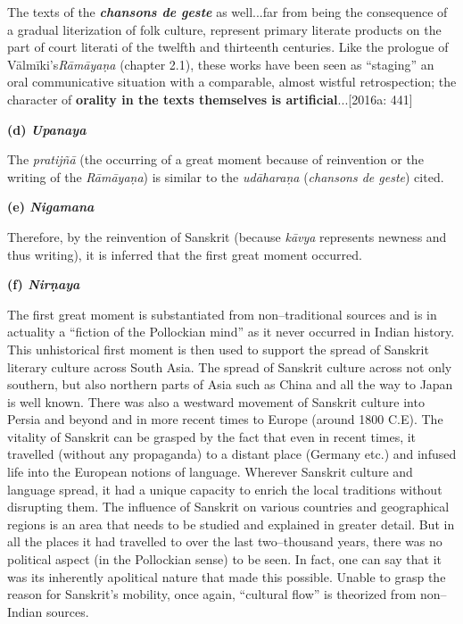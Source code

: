 \begin{myquote}
The texts of the \textit{\textbf{chansons de geste}} as well...far from being the consequence of a gradual literization of folk culture, represent primary literate products on the part of court literati of the twelfth and thirteenth centuries. Like the prologue of Vālmīki’s\textit{Rāmāyaṇa} (chapter 2.1), these works have been seen as “staging” an oral communicative situation with a comparable, almost wistful retrospection; the character of \textbf{orality in the texts themselves is artiﬁcial}...[2016a: 441]
\end{myquote}

\textbf{(d) \textit{Upanaya}}

The \textit{pratijñā }(the occurring of a great moment because of reinvention or the writing of the \textit{Rāmāyaṇa}) is similar to the \textit{udāharaṇa} (\textit{chansons de geste}) cited.

\textbf{(e) \textit{Nigamana}}

Therefore, by the reinvention of Sanskrit (because \textit{kāvya} represents newness and thus writing), it is inferred that the first great moment occurred.

\textbf{(f) \textit{Nirṇaya}}

The first great moment is substantiated from non–traditional sources and is in actuality a “fiction of the Pollockian mind” as it never occurred in Indian history. This unhistorical first moment is then used to support the spread of Sanskrit literary culture across South Asia. The spread of Sanskrit culture across not only southern, but also northern parts of Asia such as China and all the way to Japan is well known. There was also a westward movement of Sanskrit culture into Persia and beyond and in more recent times to Europe (around 1800 C.E). The vitality of Sanskrit can be grasped by the fact that even in recent times, it travelled (without any propaganda) to a distant place (Germany etc.) and infused life into the European notions of language. Wherever Sanskrit culture and language spread, it had a unique capacity to enrich the local traditions without disrupting them. The influence of Sanskrit on various countries and geographical regions is an area that needs to be studied and explained in greater detail. But in all the places it had travelled to over the last two–thousand years, there was no political aspect (in the Pollockian sense) to be seen. In fact, one can say that it was its inherently apolitical nature that made this possible. Unable to grasp the reason for Sanskrit’s mobility, once again, “cultural flow” is theorized from non–Indian sources.

